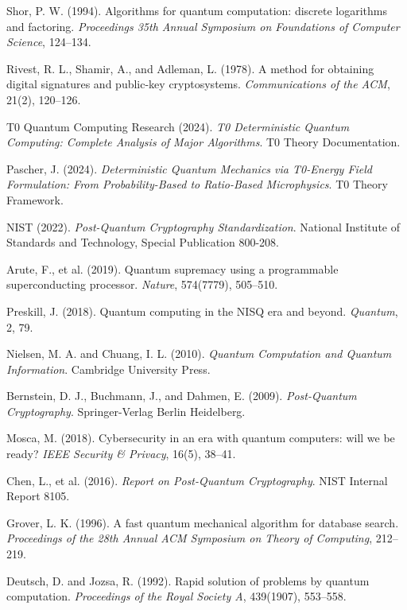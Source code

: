\documentclass[12pt,a4paper]{article}
\begin{document}
	\begin{thebibliography}{99}
		Shor, P. W. (1994). Algorithms for quantum computation: discrete logarithms and factoring. \textit{Proceedings 35th Annual Symposium on Foundations of Computer Science}, 124--134.
		
		Rivest, R. L., Shamir, A., and Adleman, L. (1978). A method for obtaining digital signatures and public-key cryptosystems. \textit{Communications of the ACM}, 21(2), 120--126.
		
		T0 Quantum Computing Research (2024). \textit{T0 Deterministic Quantum Computing: Complete Analysis of Major Algorithms}. T0 Theory Documentation.
		
		Pascher, J. (2024). \textit{Deterministic Quantum Mechanics via T0-Energy Field Formulation: From Probability-Based to Ratio-Based Microphysics}. T0 Theory Framework.
		
		NIST (2022). \textit{Post-Quantum Cryptography Standardization}. National Institute of Standards and Technology, Special Publication 800-208.
		
		Arute, F., et al. (2019). Quantum supremacy using a programmable superconducting processor. \textit{Nature}, 574(7779), 505--510.
		
		Preskill, J. (2018). Quantum computing in the NISQ era and beyond. \textit{Quantum}, 2, 79.
		
		Nielsen, M. A. and Chuang, I. L. (2010). \textit{Quantum Computation and Quantum Information}. Cambridge University Press.
		
		Bernstein, D. J., Buchmann, J., and Dahmen, E. (2009). \textit{Post-Quantum Cryptography}. Springer-Verlag Berlin Heidelberg.
		
		Mosca, M. (2018). Cybersecurity in an era with quantum computers: will we be ready? \textit{IEEE Security \& Privacy}, 16(5), 38--41.
		
		Chen, L., et al. (2016). \textit{Report on Post-Quantum Cryptography}. NIST Internal Report 8105.
		
		Grover, L. K. (1996). A fast quantum mechanical algorithm for database search. \textit{Proceedings of the 28th Annual ACM Symposium on Theory of Computing}, 212--219.
		
		Deutsch, D. and Jozsa, R. (1992). Rapid solution of problems by quantum computation. \textit{Proceedings of the Royal Society A}, 439(1907), 553--558.
		

\end{thebibliography}
\end{document}
